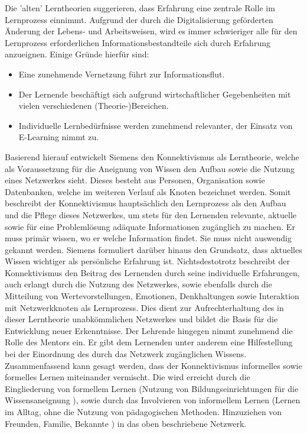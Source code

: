 Die 'alten' Lerntheorien suggerieren, dass Erfahrung eine zentrale Rolle im Lernprozess einnimmt. Aufgrund der durch die Digitalisierung geförderten Änderung der Lebens- und Arbeitsweisen, wird es immer schwieriger alle für den Lernprozess erforderlichen Informationsbestandteile sich durch Erfahrung anzueignen.\cite[S. 159ff.]{Erpenbeck.2007} Einige Gründe hierfür sind:
\begin{itemize}
	\item Eine zunehmende Vernetzung führt zur Informationsflut. 
	\item Der Lernende beschäftigt sich aufgrund wirtschaftlicher Gegebenheiten mit vielen verschiedenen (Theorie-)Bereichen.
	\item Individuelle Lernbedürfnisse werden zunehmend relevanter, der Einsatz von E-Learning nimmt zu.
\end{itemize}
Basierend hierauf entwickelt Siemens den Konnektivismus als Lerntheorie, welche als Voraussetzung für die Aneignung von Wissen den Aufbau sowie die Nutzung eines Netzwerkes sieht. Dieses besteht aus Personen, Organisation sowie Datenbanken, welche im weiteren Verlauf als Knoten bezeichnet werden. Somit beschreibt der Konnektivismus hauptsächlich den Lernprozess als den Aufbau und die Pflege dieses Netzwerkes, um stets für den Lernenden relevante, aktuelle sowie für eine Problemlösung adäquate Informationen zugänglich zu machen. Er muss primär wissen, wo er welche Information findet. Sie muss nicht auswendig gekannt werden. Siemens formuliert darüber hinaus den Grundsatz, dass aktuelles Wissen wichtiger als persönliche Erfahrung ist. Nichtsdestotrotz beschreibt der Konnektivismus den Beitrag des Lernenden durch seine individuelle Erfahrungen, auch erlangt durch die Nutzung des Netzwerkes, sowie ebenfalls durch die Mitteilung von Wertevorstellungen, Emotionen, Denkhaltungen sowie Interaktion mit Netzwerkknoten als Lernprozess. Dies dient zur Aufrechterhaltung des in dieser Lerntheorie unabkömmlichen Netzwerkes und bildet die Basis für die Entwicklung neuer Erkenntnisse. Der Lehrende hingegen nimmt zunehmend die Rolle des Mentors ein. Er gibt dem Lernenden unter anderem eine Hilfestellung bei der Einordnung des durch das Netzwerk zugänglichen Wissens. Zusammenfassend kann gesagt werden, dass der Konnektivismus informelles sowie formelles Lernen miteinander vermischt.\cite[S. 47ff.]{Kuhlmann.2008} Die wird erreicht durch die Eingliederung von formellem Lernen (Nutzung von Bildungseinrichtungen für die Wissensaneignung \cite[S. 75]{Hellmer.2007}), sowie durch das Involvieren von informellem Lernen (Lernen im Alltag, ohne die Nutzung von pädagogischen Methoden. Hinzuziehen von Freunden, Familie, Bekannte \cite[S. 76]{Hellmer.2007}) in das oben beschriebene Netzwerk.  





